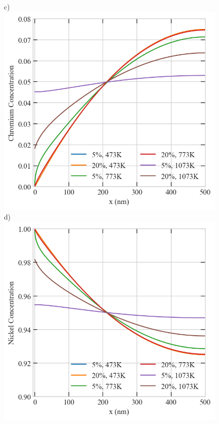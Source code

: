 \documentclass[utf8]{frontiersSCNS} %
\begin{document}
\begin{figure}[h!]
        c)\includegraphics[scale=0.55]{srrt/plots/Fig15_c.png}
        d)\includegraphics[scale=0.55]{srrt/plots/Fig15_d.png}

\end{figure}
\end{document}
